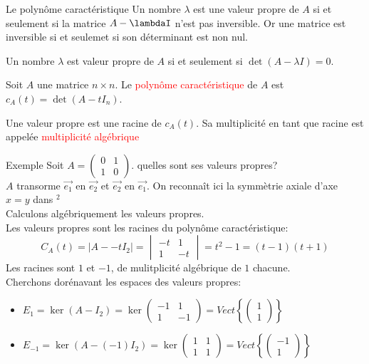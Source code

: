 \begin{parag}{Le polynôme caractéristique}
    Un nombre $\lambda$ est une valeur propre de $A$ si et seulement si la matrice $A - \lambdaI$ n'est pas inversible. Or une matrice est inversible si et seulemet si son déterminant est non nul.
    \begin{theoreme}
        Un nombre $\lambda$ est valeur propre de $A$ si et seulement si $\det (A - \lambda I) = 0$.
    \end{theoreme}
    \begin{definition}
        Soit $A$ une matrice $n \times n$. Le \textcolor{red}{polynôme caractéristique} de $A$ est $c_A(t) = \det(A - tI_n)$.
    \end{definition}
    Une valeur propre est une racine de $c_A(t)$. Sa multiplicité en tant que racine est appelée \textcolor{red}{multiplicité algébrique}


    \begin{subparag}{Exemple}
        Soit $A = \begin{pmatrix}
            0 & 1 \\ 1 & 0
        \end{pmatrix}$. quelles sont ses valeurs propres?
        \\
        $A$ transorme $\vec{e_1}$ en $\vec{e_2}$ et $\vec{e_2}$ en $\vec{e_1}$. On reconnaît ici la symmètrie axiale d'axe $x = y$ dans \R$^2$\\
        Calculons algébriquement les valeurs propres.
        \\
        Les valeurs propres sont les racines du polynôme caractéristique:
        \[C_A(t) = |A - -tI_2| = \begin{vmatrix}
            -t & 1 \\ 1 & -t
        \end{vmatrix} = t^2 -1 = (t-1)(t+1)\]
        Les racines sont $1$ et $-1$, de mulitplicité algébrique de $1$ chacune.\\
        Cherchons dorénavant les espaces des valeurs propres:
        \begin{itemize}
            \item $E_1 = \ker(A - I_2) = \ker \begin{pmatrix}
                -1 & 1 \\ 1 & -1
            \end{pmatrix} = Vect\left\{\begin{pmatrix}
                1 \\ 1
            \end{pmatrix}\right\}$
            \item $E_{-1} = \ker(A - (-1)I_2) = \ker \begin{pmatrix}
                1 & 1 \\ 1 & 1
            \end{pmatrix} = Vect\left\{\begin{pmatrix}
                -1 \\ 1
            \end{pmatrix}\right\}$
            

\end{itemize}
\end{subparag}
\end{parag}
